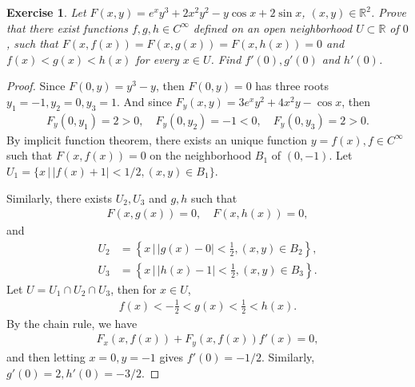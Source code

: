 \documentclass[11pt]{article}
\newtheorem{exercise}{Exercise}[section]
\theoremstyle{definition}
\numberwithin{equation}{subsection}
\begin{document}
\begin{exercise}
Let $F(x, y) = e^x y^3 + 2x^2 y^2 - y \cos x + 2 \sin x$, $(x, y) \in \mathbb{R}^2$. Prove that there exist functions $f, g, h \in C^\infty$ defined on an open neighborhood $U \subset \mathbb{R}$ of $0$, such that $F(x,f(x)) = F(x,g(x)) = F(x,h(x)) = 0$ and $f(x) < g(x) < h(x)$ for every $x \in U$. Find $f'(0), g'(0)$ and $h'(0)$.
\end{exercise}
\begin{proof}
Since $F(0,y) = y^3 - y$, then $F(0,y) = 0$ has three roots $y_1 = -1, y_2 = 0, y_3 = 1$. And since $F_y(x, y) = 3e^xy^2 + 4x^2y - \cos x$, then
\begin{align*}
    F_y(0, y_1) = 2 > 0, \quad F_y(0, y_2) = -1 < 0, \quad F_y(0, y_3) = 2 > 0.
\end{align*}
By implicit function theorem, there exists an unique function $y = f(x), f \in C^\infty$ such that $F(x, f(x)) = 0$ on the neighborhood $B_1$ of $(0, -1)$. Let $U_1 = \{x \, |\, \left|f(x) + 1\right| < 1/2, (x, y) \in B_1\}$.

Similarly, there exists $U_2, U_3$ and $g, h$ such that
\begin{align*}
    F(x, g(x)) = 0, \quad F(x, h(x)) = 0,
\end{align*}
and 
\begin{align*}
    U_2 & = \left\{x \, \Bigg|\, \left|g(x) - 0\right| < \frac{1}{2}, (x, y) \in B_2\right\}, \\
    U_3 & = \left\{x \, \Bigg|\, \left|h(x) - 1\right| < \frac{1}{2}, (x, y) \in B_3\right\}.
\end{align*}
Let $U = U_1 \cap U_2 \cap U_3$, then for $x \in U$,
\begin{align*}
    f(x) < -\frac{1}{2} < g(x) < \frac{1}{2} < h(x).
\end{align*}
By the chain rule, we have
\begin{align*}
    F_x(x, f(x)) + F_y(x, f(x))f'(x) = 0,
\end{align*}
and then letting $x = 0, y = -1$ gives $f'(0) = - 1/2$. Similarly, $g'(0) = 2, h'(0) = - 3/2$.
\end{proof}

\medskip
\end{document}
